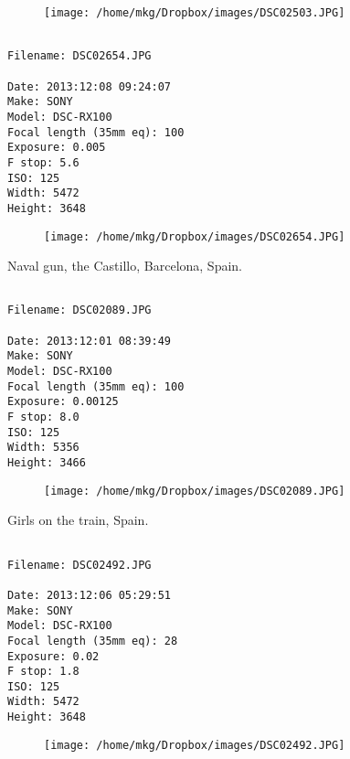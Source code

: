 \begin{figure}
\texttt{[image: /home/mkg/Dropbox/images/DSC02503.JPG]}
\end{figure}
    
\clearpage
\onecolumn
\noindent 
\noindent
\begin{lstlisting}

Filename: DSC02654.JPG

Date: 2013:12:08 09:24:07
Make: SONY
Model: DSC-RX100
Focal length (35mm eq): 100
Exposure: 0.005
F stop: 5.6
ISO: 125
Width: 5472
Height: 3648
\end{lstlisting}
\clearpage

\begin{figure}
\texttt{[image: /home/mkg/Dropbox/images/DSC02654.JPG]}
\end{figure}
    
\clearpage
\onecolumn
\noindent Naval gun, the Castillo, Barcelona, Spain.
\noindent
\begin{lstlisting}

Filename: DSC02089.JPG

Date: 2013:12:01 08:39:49
Make: SONY
Model: DSC-RX100
Focal length (35mm eq): 100
Exposure: 0.00125
F stop: 8.0
ISO: 125
Width: 5356
Height: 3466
\end{lstlisting}
\clearpage

\begin{figure}
\texttt{[image: /home/mkg/Dropbox/images/DSC02089.JPG]}
\end{figure}
    
\clearpage
\onecolumn
\noindent Girls on the train, Spain.
\noindent
\begin{lstlisting}

Filename: DSC02492.JPG

Date: 2013:12:06 05:29:51
Make: SONY
Model: DSC-RX100
Focal length (35mm eq): 28
Exposure: 0.02
F stop: 1.8
ISO: 125
Width: 5472
Height: 3648
\end{lstlisting}
\clearpage

\begin{figure}
\texttt{[image: /home/mkg/Dropbox/images/DSC02492.JPG]}
\end{figure}
    
